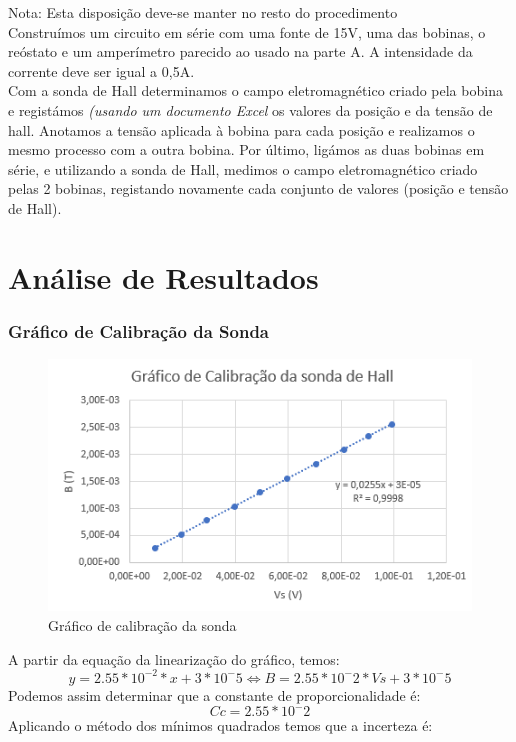 \small Nota: Esta disposição deve-se manter no resto do procedimento \\

Construímos um circuito em série com uma fonte de 15V, uma das bobinas, o reóstato e um amperímetro parecido ao usado na parte A. A intensidade da corrente deve ser igual a 0,5A. \\
Com a sonda de Hall determinamos o campo eletromagnético criado pela bobina e registámos \textit{(usando um documento Excel} os valores da posição e da tensão de hall. Anotamos a tensão aplicada à bobina para cada posição e realizamos o mesmo processo com a outra bobina. Por último, ligámos as duas bobinas em série, e utilizando a sonda de Hall, medimos o campo eletromagnético criado pelas 2 bobinas, registando novamente cada conjunto de valores (posição e tensão de Hall). \\

\chapter*{Análise de Resultados}

\subsection*{Gráfico de Calibração da Sonda}
	
	\begin{figure}[H]
		\centering
		\includegraphics[width=15cm]{./grafico_solenoide.jpeg}
		\caption{Gráfico de calibração da sonda}
	\end{figure}
	
A partir da equação da linearização do gráfico, temos: \\

\begin{equation}
y=2.55*10^{-2}*x + 3*10^-5 
\Leftrightarrow B=2.55*10^-2*Vs + 3*10^-5
\end{equation}
Podemos assim determinar que a constante de proporcionalidade é: \\
\begin{equation}
Cc=2.55*10^-2
\end{equation}
Aplicando o método dos mínimos quadrados temos que a incerteza é: \\

